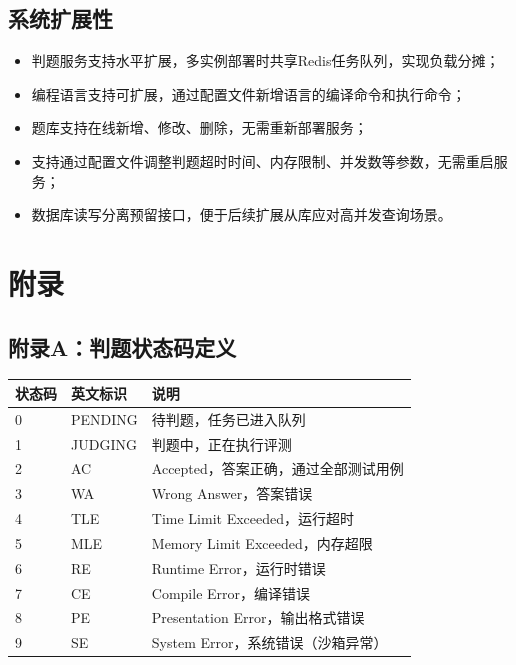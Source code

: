 \documentclass{../template/softeng}
\begin{document}
\subsection{系统扩展性}
\begin{itemize}
	\item 判题服务支持水平扩展，多实例部署时共享Redis任务队列，实现负载分摊；
	\item 编程语言支持可扩展，通过配置文件新增语言的编译命令和执行命令；
	\item 题库支持在线新增、修改、删除，无需重新部署服务；
	\item 支持通过配置文件调整判题超时时间、内存限制、并发数等参数，无需重启服务；
	\item 数据库读写分离预留接口，便于后续扩展从库应对高并发查询场景。
\end{itemize}

\section{附录}

\subsection{附录A：判题状态码定义}
\begin{longtable}{|p{3cm}|p{3cm}|p{8cm}|}
	\hline
	\textbf{状态码} & \textbf{英文标识} & \textbf{说明} \\
	\hline
	0 & PENDING & 待判题，任务已进入队列 \\
	\hline
	1 & JUDGING & 判题中，正在执行评测 \\
	\hline
	2 & AC & Accepted，答案正确，通过全部测试用例 \\
	\hline
	3 & WA & Wrong Answer，答案错误 \\
	\hline
	4 & TLE & Time Limit Exceeded，运行超时 \\
	\hline
	5 & MLE & Memory Limit Exceeded，内存超限 \\
	\hline
	6 & RE & Runtime Error，运行时错误 \\
	\hline
	7 & CE & Compile Error，编译错误 \\
	\hline
	8 & PE & Presentation Error，输出格式错误 \\
	\hline
	9 & SE & System Error，系统错误（沙箱异常） \\
	\hline
\end{longtable}
\end{document}

